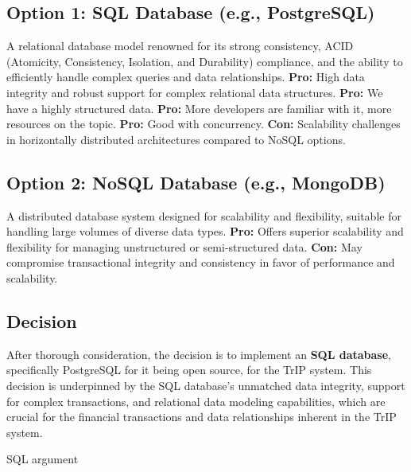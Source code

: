 \subsection*{Option 1: SQL Database (e.g., PostgreSQL)}
A relational database model renowned for its strong consistency, ACID (Atomicity, Consistency, Isolation, and Durability) compliance, and the ability to efficiently handle complex queries and data relationships.
\textbf{Pro:} High data integrity and robust support for complex relational data structures.
\textbf{Pro:} We have a highly structured data.
\textbf{Pro:} More developers are familiar with it, more resources on the topic.
\textbf{Pro:} Good with concurrency.
\textbf{Con:} Scalability challenges in horizontally distributed architectures compared to NoSQL options.

\subsection*{Option 2: NoSQL Database (e.g., MongoDB)}
A distributed database system designed for scalability and flexibility, suitable for handling large volumes of diverse data types.
\textbf{Pro:} Offers superior scalability and flexibility for managing unstructured or semi-structured data.
\textbf{Con:} May compromise transactional integrity and consistency in favor of performance and scalability.

\subsection*{Decision}
After thorough consideration, the decision is to implement an \textbf{SQL database}, specifically PostgreSQL for it being open source, for the TrIP system. This decision is underpinned by the SQL database's unmatched data integrity, support for complex transactions, and relational data modeling capabilities, which are crucial for the financial transactions and data relationships inherent in the TrIP system.

SQL argument
